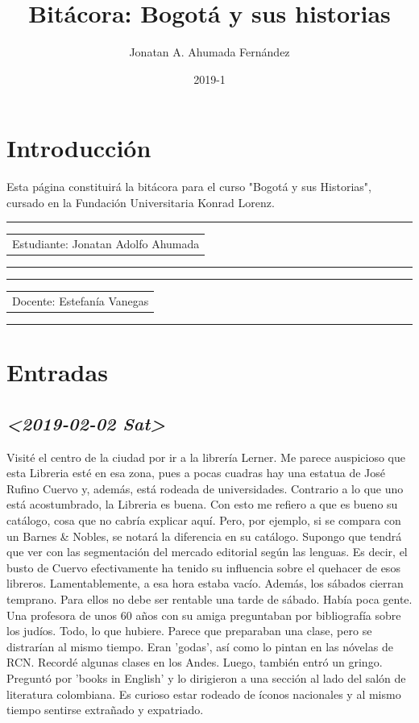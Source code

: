 \documentclass[11pt]{article}
\author{Jonatan A. Ahumada Fernández}
\date{2019-1}
\title{Bitácora: Bogotá y sus historias}
\begin{document}
\maketitle
\tableofcontents


\section{Introducción}
\label{sec-1}
Esta página constituirá la bitácora para el curso "Bogotá y sus Historias", cursado en la Fundación Universitaria Konrad Lorenz.

\rule{\linewidth}{0.5pt}
\begin{center}
\begin{tabular}{l}
Estudiante: Jonatan Adolfo Ahumada\\
\end{tabular}
\end{center}

\rule{\linewidth}{0.5pt}

\rule{\linewidth}{0.5pt}
\begin{center}
\begin{tabular}{l}
Docente: Estefanía Vanegas\\
\end{tabular}
\end{center}

\rule{\linewidth}{0.5pt}

\section{Entradas}
\label{sec-2}
\subsection{\textit{<2019-02-02 Sat>}}
\label{sec-2-1}

Visité el centro de la ciudad por ir a la librería Lerner. Me parece auspicioso que esta Libreria esté
en esa zona, pues a pocas cuadras hay una estatua de José Rufino Cuervo y, además, está rodeada de 
universidades. Contrario a lo que uno está acostumbrado, la Libreria es buena. Con esto me refiero a
que es bueno su catálogo, cosa que no cabría explicar aquí. Pero, por ejemplo, si se compara con un Barnes \& Nobles, 
se notará la diferencia en su catálogo. Supongo que tendrá que ver con las segmentación del mercado editorial según las 
lenguas. Es decir, el busto de Cuervo efectivamente ha tenido su influencia sobre el quehacer de esos libreros. Lamentablemente, a esa hora estaba vacío.
Además, los sábados cierran temprano. Para ellos no debe ser rentable una tarde de sábado.  Había poca gente. Una profesora de unos 60 años con su amiga preguntaban
por bibliografía sobre los judíos. Todo, lo que hubiere. Parece que preparaban una clase, pero se distrarían al mismo tiempo. Eran 'godas', así como lo pintan 
en las nóvelas de RCN. Recordé algunas clases en los Andes. Luego, también entró un gringo. Preguntó por 'books in English' y lo dirigieron a una sección al lado 
del salón de literatura colombiana. Es curioso estar rodeado de íconos nacionales y al mismo tiempo sentirse extrañado y expatriado.  
\end{document}
